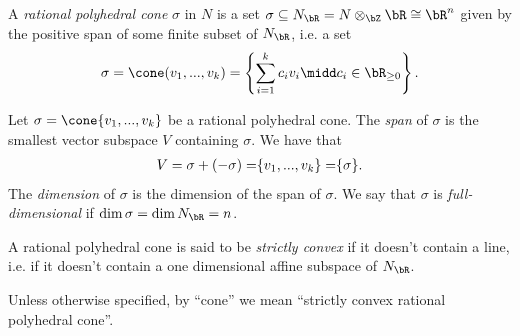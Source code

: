 \begin{defn}\label{defn:rational-poly-cone}
	A \emph{rational polyhedral cone} $\sigma$ in $N$ is a set $\sigma \subseteq N_\bR = N \otimes_\bZ\bR \cong \bR^n$ given by the positive span of some finite subset of $N_\bR$, i.e. a set
	\begin{align*}
		\sigma = \cone(v_1,...,v_k) = \left\{\sum_{i=1}^{k}c_iv_i \midd c_i \in \bR_{\geq 0}\right\}.
	\end{align*}
\end{defn}
\begin{defn}\label{defn:span-dim-of-cone}
	Let $\sigma = \cone\{v_1, ...,v_k\}$ be a rational polyhedral cone. The \emph{span} of $\sigma$ is the smallest vector subspace $V$ containing $\sigma$. We have that
	\begin{align*}
		V = \sigma + (-\sigma) = \span\{v_1,...,v_k\} = \span\{\sigma\}.
	\end{align*}
	The \emph{dimension} of $\sigma$ is the dimension of the span of $\sigma$. We say that $\sigma$ is \emph{full-dimensional} if $\dim \sigma = \dim N_\bR = n$. 
\end{defn}
\begin{defn}\label{defn:strictly-convex}
	A rational polyhedral cone is said to be \emph{strictly convex} if it doesn't contain a line, i.e. if it doesn't contain a one dimensional affine subspace of $N_\bR$.

	Unless otherwise specified, by ``cone'' we mean ``strictly convex rational polyhedral cone''.
\end{defn}

